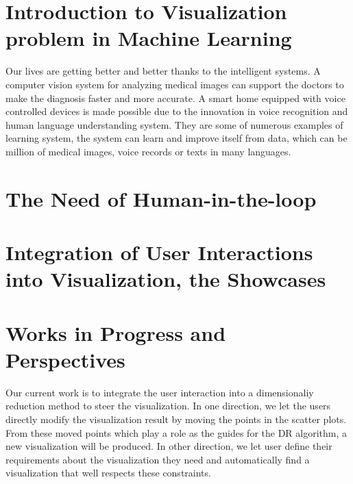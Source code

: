 \section{Introduction to Visualization problem in Machine Learning}

Our lives are getting better and better thanks to the intelligent systems.
A computer vision system for analyzing medical images can support the doctors to make the diagnosis faster and more accurate.
A smart home equipped with voice controlled devices is made possible due to the innovation in voice recognition and human language understanding system.
They are some of numerous examples of learning system, the system can learn and improve itself from data, which can be million of medical images, voice records or texts in many languages.







\section{The Need of Human-in-the-loop}





\section{Integration of User Interactions into Visualization, the Showcases}



\section{Works in Progress and Perspectives}

Our current work is to integrate the user interaction into a dimensionaliy reduction method to steer the visualization.
In one direction, we let the users directly modify the visualization result by moving the points in the scatter plots.
From these moved points which play a role as the guides for the DR algorithm, a new visualization will be produced.
In other direction, we let user define their requirements about the visualization they need and automatically find a visualization that well respects these constraints.

